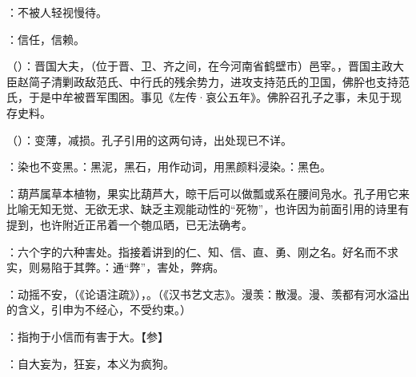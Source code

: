 {
\item {}：不被人轻视慢待。
\item {}：信任，信赖。
}
{}


{
\item {}（）：晋国大夫，（位于晋、卫、齐之间，在今河南省鹤壁市）邑宰。，晋国主政大臣赵简子清剿政敌范氏、中行氏的残余势力，进攻支持范氏的卫国，佛肸也支持范氏，于是中牟被晋军围困。事见《左传·哀公五年》。佛肸召孔子之事，未见于现存史料。%
\item {}（）：变薄，减损。孔子引用的这两句诗，出处现已不详。

：染也不变黑。：黑泥，黑石，用作动词，用黑颜料浸染。：黑色。

\item {}：葫芦属草本植物，果实比葫芦大，晾干后可以做瓢或系在腰间凫水。孔子用它来比喻无知无觉、无欲无求、缺乏主观能动性的“死物”，也许因为前面引用的诗里有提到，也许附近正吊着一个匏瓜晒，已无法确考。
}
{}


{
\item {}：六个字的六种害处。指接着讲到的仁、知、信、直、勇、刚之名。好名而不求实，则易陷于其弊。：通“弊”，害处，弊病。
\item {}：动摇不安，（《论语注疏》），。（《汉书艺文志》。漫羡：散漫。漫、羡都有河水溢出的含义，引申为不经心，不受约束。）
\item {}：指拘于小信而有害于大。【参】 
\item {}：自大妄为，狂妄，本义为疯狗。
}
{}  %


